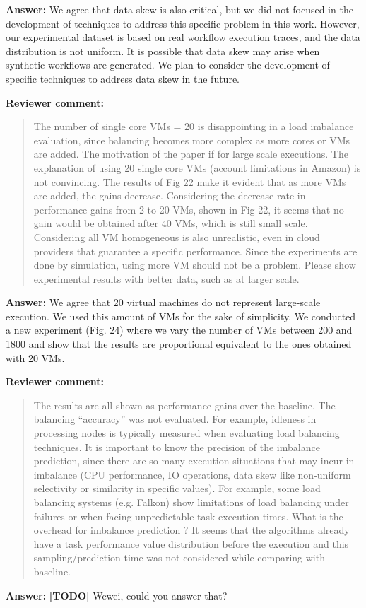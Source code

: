 \documentclass{letter}
\newenvironment{review}%
{\textbf{Reviewer comment:}\begin{quote}}%
{\end{quote}}%
\newcommand{\todo}[1]{%
      \color{red}\textbf{[TODO]} #1\color{black}}
\newcommand{\answer}[1]{%
      \textbf{Answer:} #1}
\begin{document}
\begin{letter}{}
\answer{We agree that data skew is also critical, but we did not focused in the development of techniques to address this specific problem in this work. However, our experimental dataset is based on real workflow execution traces, and the data distribution is not uniform. It is possible that data skew may arise when synthetic workflows are generated. We plan to consider the development of specific techniques to address data skew in the future.}


\begin{review}
The number of single core VMs = 20 is disappointing in a load imbalance evaluation, since balancing becomes more complex as more cores or VMs are added. The motivation of the paper if for large scale executions. The explanation of using 20 single core VMs (account limitations in Amazon) is not convincing. The results of Fig 22 make it evident that as more VMs are added, the gains decrease. Considering the decrease rate in performance gains from 2 to 20 VMs, shown in Fig 22, it seems that no gain would be obtained after 40 VMs, which is still small scale. Considering all VM homogeneous is also unrealistic, even in cloud providers that guarantee a specific performance. Since the experiments are done by simulation, using more VM should not be a problem. Please show experimental results with better data, such as at larger scale. 
\end{review}

\answer{We agree that 20 virtual machines do not represent large-scale execution. We used this amount of VMs for the sake of simplicity. We conducted a new experiment (Fig. 24) where we vary the number of VMs between 200 and 1800 and show that the results are proportional equivalent to the ones obtained with 20 VMs.}


\begin{review}
The results are all shown as performance gains over the baseline. The balancing ``accuracy'' was not evaluated. For example, idleness in processing nodes is typically measured when evaluating load balancing techniques. It is important to know the precision of the imbalance prediction, since there are so many execution situations that may incur in imbalance (CPU performance, IO operations, data skew like non-uniform selectivity or similarity in specific values). For example, some load balancing systems (e.g. Falkon) show limitations of load balancing under failures or when facing unpredictable task execution times. What is the overhead for imbalance prediction ? It seems that the algorithms already have a task performance value distribution before the execution and this sampling/prediction time was not considered while comparing with baseline.
\end{review}

\answer{\todo{Wewei, could you answer that?}}



\end{letter}
\end{document}
